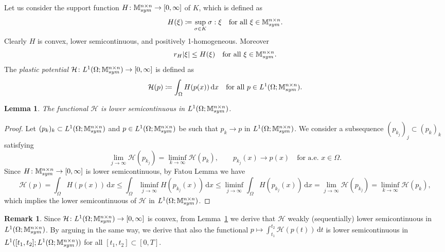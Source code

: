 \documentclass[reqno]{amsart}
\newtheorem{lemma}[corollary]{Lemma}
\theoremstyle{definition}
\newtheorem{remark}[corollary]{Remark}
\numberwithin{equation}{section}
\def\de {\mathrm{d}}
\def\M {\mathbb M^{n\times n}_{\rm sym}}
\begin{document}
Let us consider the support function $H\colon\M\to [0,\infty]$ of $K$, which is defined as
\begin{equation*}
H(\xi)\coloneqq \sup_{\sigma\in K}\sigma:\xi\quad\text{for all $\xi\in\M$}.
\end{equation*}
Clearly $H$ is convex, lower semicontinuous, and positively 1-homogeneous. Moreover
\begin{equation}\label{eq:rH}
r_H|\xi|\le H(\xi)\quad\text{for all $\xi\in\M$}.
\end{equation}
The {\it plastic potential} $\mathcal H\colon L^1(\Omega;\M)\to [0,\infty]$ is defined as 
\begin{equation*}
\mathcal H(p)\coloneqq \int_\Omega H(p(x)) \,\de x\quad\text{for all $p\in L^1(\Omega;\M)$}.
\end{equation*}

\begin{lemma}\label{lem:lsc}
The functional $\mathcal H$ is lower semicontinuous in $L^1(\Omega;\M)$.
\end{lemma}

\begin{proof}
Let $(p_k)_k\subset L^1(\Omega;\M)$ and $p\in L^1(\Omega;\M)$ be such that $p_k\to p$ in $L^1(\Omega;\M)$. We consider a subsequence $(p_{k_j})_j\subset (p_k)_k$ satisfying
$$\lim_{j\to\infty}\mathcal H(p_{k_j})=\liminf_{k\to\infty}\mathcal H(p_k),\qquad p_{k_j}(x)\to p(x)\quad\text{for a.e.\ $x\in\Omega$}.$$
Since $H\colon\M\to [0,\infty]$ is lower semicontinuous, by Fatou Lemma we have
$$\mathcal H(p)=\int_\Omega H(p(x))\,\de x\le \int_\Omega \liminf_{j\to\infty}H(p_{k_j}(x))\,\de x\le \liminf_{j\to\infty}\int_\Omega H(p_{k_j}(x))\,\de x=\lim_{j\to\infty}\mathcal H(p_{k_j})=\liminf_{k\to\infty}\mathcal H(p_k),$$
which implies the lower semicontinuous of $\mathcal H$ in $L^1(\Omega;\M)$.
\end{proof}

\begin{remark}\label{rem:lsc}
Since $\mathcal H\colon L^1(\Omega;\M)\to [0,\infty]$ is convex, from Lemma~\ref{lem:lsc} we derive that $\mathcal H$ weakly (sequentially) lower semicontinuous in $L^1(\Omega;\M)$. By arguing in the same way, we derive that also the functional $p\mapsto \int_{t_1}^{t_2}\mathcal H(p(t))\,\de t$ is lower semicontinuous in $L^1([t_1,t_2];L^1(\Omega;\M))$ for all $[t_1,t_2]\subset[0,T]$. \end{remark}
\end{document}
